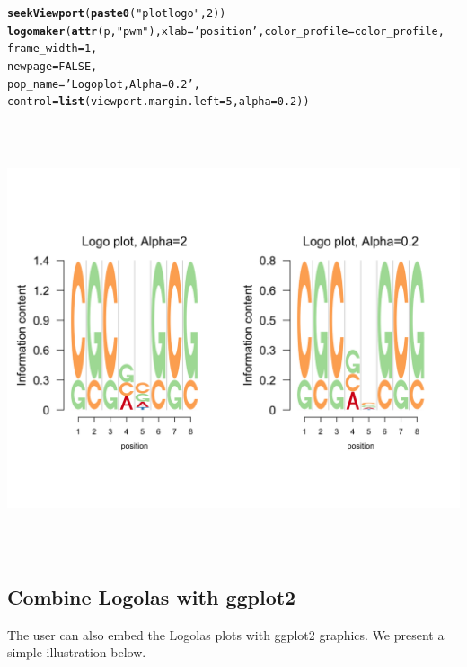 \documentclass[12pt]{article}\usepackage[]{graphicx}\usepackage[usenames,dvipsnames]{color}
\makeatletter
\newcommand{\hlnum}[1]{\textcolor[rgb]{0.686,0.059,0.569}{#1}}%
\newcommand{\hlstr}[1]{\textcolor[rgb]{0.192,0.494,0.8}{#1}}%
\newcommand{\hlstd}[1]{\textcolor[rgb]{0.345,0.345,0.345}{#1}}%
\newcommand{\hlkwc}[1]{\textcolor[rgb]{0.333,0.667,0.333}{#1}}%
\newcommand{\hlkwd}[1]{\textcolor[rgb]{0.737,0.353,0.396}{\textbf{#1}}}%
\newenvironment{kframe}{%
 \def\at@end@of@kframe{}%
 \ifinner\ifhmode%
  \def\at@end@of@kframe{\end{minipage}}%
  \begin{minipage}{\columnwidth}%
 \fi\fi%
 \def\FrameCommand##1{\hskip\@totalleftmargin \hskip-\fboxsep
 \colorbox{shadecolor}{##1}\hskip-\fboxsep
     \hskip-\linewidth \hskip-\@totalleftmargin \hskip\columnwidth}%
 \MakeFramed {\advance\hsize-\width
   \@totalleftmargin\z@ \linewidth\hsize
   \@setminipage}}%
 {\par\unskip\endMakeFramed%
 \at@end@of@kframe}
\newenvironment{knitrout}{}{} %
\makeatother
\begin{document}
\begin{knitrout}
\begin{kframe}
\begin{alltt}
\hlkwd{seekViewport}\hlstd{(}\hlkwd{paste0}\hlstd{(}\hlstr{"plotlogo"}\hlstd{,} \hlnum{2}\hlstd{))}
\hlkwd{logomaker}\hlstd{(}\hlkwd{attr}\hlstd{(p,} \hlstr{"pwm"}\hlstd{),}\hlkwc{xlab} \hlstd{=} \hlstr{'position'}\hlstd{,}\hlkwc{color_profile} \hlstd{= color_profile,}
          \hlkwc{frame_width} \hlstd{=} \hlnum{1}\hlstd{,}
          \hlkwc{newpage} \hlstd{=} \hlnum{FALSE}\hlstd{,}
          \hlkwc{pop_name} \hlstd{=} \hlstr{'Logo plot, Alpha=0.2'}\hlstd{,}
          \hlkwc{control} \hlstd{=} \hlkwd{list}\hlstd{(}\hlkwc{viewport.margin.left} \hlstd{=} \hlnum{5}\hlstd{,}\hlkwc{alpha}\hlstd{=}\hlnum{0.2}\hlstd{))}
\end{alltt}
\end{kframe}
\includegraphics[width=6in,height=5in]{figure/entropy-1} 

\end{knitrout}


\subsection{Combine Logolas with ggplot2}

The user can also embed the Logolas plots with ggplot2 graphics. We present a simple illustration below.
\end{document}
